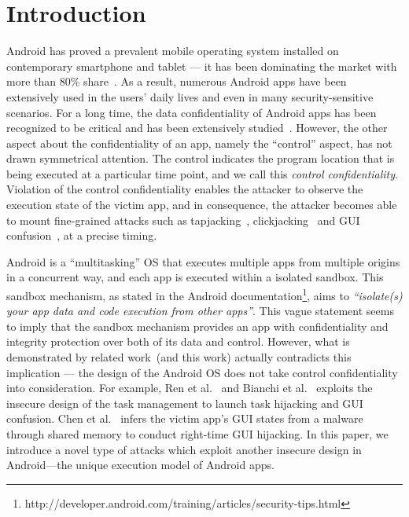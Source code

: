 \section{Introduction}
Android has proved a prevalent mobile operating system installed on contemporary smartphone and tablet --- it has been dominating the market with more than 80\% share~\cite{idc}. 
As a result, numerous Android apps have been extensively used in the users' daily lives and even in many security-sensitive scenarios. 
For a long time, the data confidentiality of Android apps has been recognized to be critical and has been extensively studied~\cite{flowdroid,....@chenkai,find 4 here}. 
However, the other aspect about the confidentiality of an app, namely the ``control'' aspect, 
has not drawn symmetrical attention. 
The control indicates the program location that is being executed at a particular time point, 
and we call this \emph{control confidentiality}. 
Violation of the control confidentiality enables the attacker to observe the execution state of the victim app, 
and in consequence, the attacker becomes able to mount fine-grained attacks such as tapjacking~\cite{@chenkai: add citation here, you can find the citation in the oakland paper}, 
clickjacking~\cite{find one or two, may be GUI state paper mentioned some} and GUI confusion~\cite{oakland paper}, at a precise timing. 

Android is a ``multitasking'' OS that executes multiple apps from multiple origins in a concurrent way, and  
each app is executed within a isolated sandbox. 
This sandbox mechanism, as stated in the Android documentation\footnote{http://developer.android.com/training/articles/security-tips.html}, aims to \emph{``isolate(s) your app data and code execution from other apps''}. 
This vague statement seems to imply that the sandbox mechanism 
provides an app with confidentiality and integrity protection over both of its data and control.  
However, what is demonstrated by related work~(and this work) actually contradicts this implication ---
the design of the Android OS does not take control confidentiality into consideration. 
For example, Ren et al.~\cite{usenix15 paper} and Bianchi et al.~\cite{oakland paper} 
exploits the insecure design of the task management to launch task hijacking and GUI confusion. 
Chen et al.~\cite{GUI state paper} infers the victim app's GUI states from a malware through shared memory to conduct right-time GUI hijacking. 
In this paper, we introduce a novel type of attacks which exploit another insecure design in Android---the unique execution model of Android apps.

